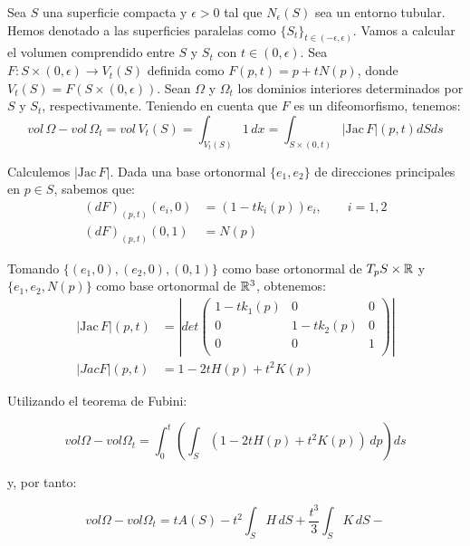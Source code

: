 \begin{remark}
Sea $S$ una superficie compacta y $\epsilon > 0$ tal que $N_\epsilon(S)$ sea un entorno tubular. Hemos denotado a las superficies paralelas como $\{S_t\}_{t \in (-\epsilon, \epsilon)}$. Vamos a calcular el volumen comprendido entre $S$ y $S_t$ con $t\in (0, \epsilon)$. Sea $F: S \times (0, \epsilon) \longrightarrow V_t(S)$ definida como $F(p, t) = p + tN(p)$, donde $V_t(S)=F(S \times (0,\epsilon))$. Sean $\Omega$ y $\Omega_t$ los dominios interiores determinados por $S$ y $S_t$, respectivamente. Teniendo en cuenta que $F$ es un difeomorfismo, tenemos:
%
\begin{equation*}
    vol \, \Omega - vol \, \Omega_t = vol \, V_t(S) = \int_{V_t(S)} 1 \, dx = \int_{S \times (0,t)} |\text{Jac} \, F|(p,t)dSds
\end{equation*}

Calculemos $|\text{Jac} \, F|$. Dada una base ortonormal $\{e_1, e_2\}$ de direcciones principales en $p \in S$, sabemos que:
%
\begin{align*}
    (dF)_{(p,t)}(e_i,0) &= (1-tk_i(p))e_i, \qquad i = 1,2 \\
    (dF)_{(p,t)}(0,1) &= N(p)
\end{align*}

Tomando $\{(e_1,0), (e_2,0), (0,1)\}$ como base ortonormal de $T_pS \times \mathbb{R}$ y $\{e_1, e_2, N(p)\}$ como base ortonormal de $\mathbb{R}^3$, obtenemos:
%
\begin{align*}
    |\text{Jac} \, F|(p,t) &= \left|
  det \left( {\begin{array}{ccc}
   1 - tk_1(p) & 0 & 0 \\
   0 & 1-tk_2(p) & 0 \\
   0 & 0 & 1 \\
  \end{array} } \right) \right| \\
  |Jac F|(p,t) &= 1 - 2tH(p) + t^2K(p)
\end{align*}

Utilizando el teorema de Fubini:

\begin{equation*}
    vol \Omega - vol \Omega_t = \int_0^t \left( \int_{S} \left( 1-2tH(p)+t^2K(p) \right) \, dp \right) ds
\end{equation*}

y, por tanto:

\begin{equation}\label{volumeparallelsurface}
    vol \Omega - vol \Omega_t = tA(S) - t^2\int_S H \, dS + \frac{t^3}{3}\int_S K \, dS-
\end{equation}
\end{remark}

